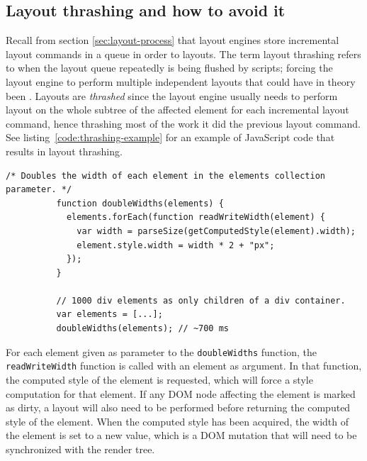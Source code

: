 \documentclass[a4paper,11pt]{kth-mag}
\newcommand{\code}[1]{\texttt{#1}}
\begin{document}
      \subsection{Layout thrashing and how to avoid it}\label{sec:layout-thrashing}
        Recall from section \ref{sec:layout-process} that \glspl{layout engine} store incremental layout commands in a queue in order to  layouts.
        The term \gls{layout thrashing} refers to when the layout queue repeatedly is being flushed by scripts; forcing the \gls{layout engine} to perform multiple independent layouts that could have in theory been .
        Layouts are \emph{thrashed} since the \gls{layout engine} usually needs to perform layout on the whole subtree of the affected element for each incremental layout command, hence thrashing most of the work it did the previous layout command.
        See listing~\ref{code:thrashing-example} for an example of \gls{JavaScript} code that results in \gls{layout thrashing}.
        \begin{lstlisting}[gobble=10,caption={Example of \gls{layout thrashing}. The code reads and double the widths of 1000 \glspl{element} in \textasciitilde700 ms. The \code{parseSize} function is not important to understand the example.}, captionpos=b, label={code:thrashing-example}]
          /* Doubles the width of each element in the elements collection parameter. */
          function doubleWidths(elements) {
            elements.forEach(function readWriteWidth(element) {
              var width = parseSize(getComputedStyle(element).width);
              element.style.width = width * 2 + "px";
            });
          }

          // 1000 div elements as only children of a div container.
          var elements = [...];
          doubleWidths(elements); // ~700 ms
        \end{lstlisting}
        For each element given as parameter to the \code{doubleWidths} function, the \code{readWriteWidth} function is called with an element as argument.
        In that function, the computed style of the element is requested, which will force a style computation for that \gls{element}.
        If any \gls{DOM} node affecting the element is marked as dirty, a layout will also need to be performed before returning the computed style of the \gls{element}.
        When the computed style has been acquired, the width of the \gls{element} is set to a new value, which is a \gls{DOM} mutation that will need to be synchronized with the \gls{render tree}.
\end{document}
